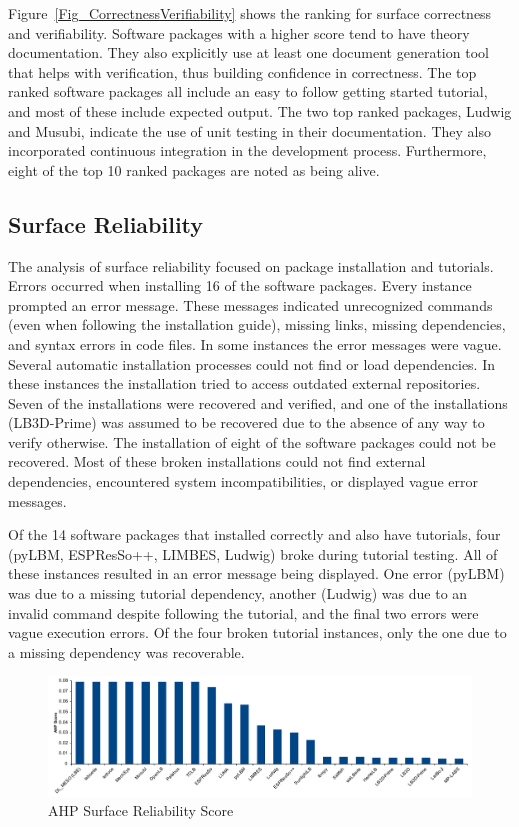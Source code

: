 \documentclass[final, 3p, times, authoryear]{elsarticle}
\begin{document}
Figure~\ref{Fig_CorrectnessVerifiability} shows the ranking for surface
correctness and verifiability. Software packages with a higher score tend to
have theory documentation. They also explicitly use at least one document
generation tool that helps with verification, thus building confidence in
correctness. The top ranked software packages all include an easy to follow
getting started tutorial, and most of these include expected output. The two top
ranked packages, Ludwig and Musubi, indicate the use of unit testing in their
documentation. They also incorporated continuous integration in the development
process. Furthermore, eight of the top 10 ranked packages are noted as being
alive.

\subsection{Surface Reliability}

The analysis of surface reliability focused on package installation and
tutorials. Errors occurred when installing 16 of the software packages. Every
instance prompted an error message. These messages indicated unrecognized
commands (even when following the installation guide), missing links, missing
dependencies, and syntax errors in code files. In some instances the error
messages were vague. Several automatic installation processes could not find or
load dependencies. In these instances the installation tried to access outdated
external repositories. Seven of the installations were recovered and verified,
and one of the installations (LB3D-Prime) was assumed to be recovered due to the
absence of any way to verify otherwise. The installation of eight of the software
packages could not be recovered. Most of these broken installations could not
find external dependencies, encountered system incompatibilities, or displayed
vague error messages.

Of the 14 software packages that installed correctly and also have tutorials,
four (pyLBM, ESPResSo++, LIMBES, Ludwig) broke during tutorial testing. All of
these instances resulted in an error message being displayed. One error (pyLBM)
was due to a missing tutorial dependency, another (Ludwig) was due to an invalid
command despite following the tutorial, and the final two errors were vague
execution errors. Of the four broken tutorial instances, only the one due to a
missing dependency was recoverable. 

\begin{figure}[h!]
	\begin{center}
		\includegraphics[width=1.0\textwidth]{./figures/reliability_chart.pdf}
		\caption{AHP Surface Reliability Score}
		\label{Fig_Reliability}
	\end{center}
\end{figure}
\end{document}
